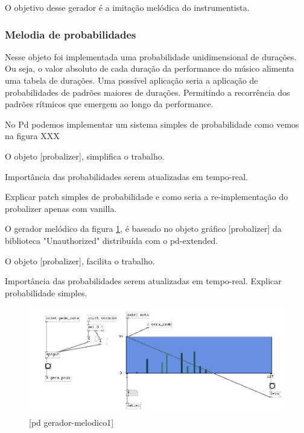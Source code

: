 \documentclass[draft]{ppgmus}
\begin{document}
O objetivo desse gerador é a imitação melódica
do instrumentista.

\subsubsection{Melodia de probabilidades}



Nesse objeto foi implementada uma probabilidade unidimensional
de durações. Ou seja, o valor absoluto de cada duração
da performance do músico alimenta uma tabela de durações.
Uma possível aplicação seria a aplicação de probabilidades de 
padrões maiores de durações. Permitindo a recorrência dos padrões
rítmicos que emergem ao longo da performance.


No Pd podemos implementar um sistema simples de probabilidade como 
vemos na figura XXX




O objeto [probalizer], simplifica o trabalho.

Importância das probabilidades serem atualizadas em
tempo-real.

Explicar patch simples de probabilidade e como
seria a re-implementação do probalizer apenas com vanilla.


O gerador melódico da figura \ref{gera-melodico1}, é baseado
no objeto gráfico [probalizer] da biblioteca "Unauthorized"
distribuída com o pd-extended.

O objeto [probalizer], facilita o trabalho.

Importância das probabilidades serem atualizadas em
tempo-real.
Explicar probabilidade simples.

\begin{figure}
\includegraphics[scale=.6]{gera-melodico1}
\caption{[pd gerador-melodico1]}
\label{gera-melodico1}
\end{figure}  
\end{document}
